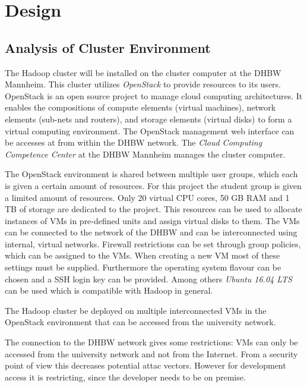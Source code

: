 \chapter{Design}
\label{chap:design}

\section{Analysis of Cluster Environment}

The Hadoop cluster will be installed on the cluster computer at the \ac{DHBW} Mannheim.
This cluster utilizes \emph{OpenStack}  to provide resources to its users. 
OpenStack is an open source project to manage cloud computing architectures.
It enables the compositions of compute elements (virtual machines), network elements (sub-nets and routers), 
and storage elements (virtual disks) to form a virtual computing environment.
The OpenStack management web interface can be accesses at  from within the \ac{DHBW} network. 
The \emph{Cloud Computing Competence Center} at the \ac{DHBW} Mannheim  manages the cluster computer.

The OpenStack environment is shared between multiple user groups, 
which each is given a certain amount of resources. 
For this project the student group is given a limited amount of resources.
Only 20 virtual \ac{CPU} cores, 50 \ac{GB} \ac{RAM} and 1 \ac{TB} of storage are dedicated to the project.
This resources can be used to allocate instances of \acp{VM} in pre-defined units and assign virtual disks to them.
The \acp{VM} can be connected to the network of the \ac{DHBW} and can be interconnected using internal, virtual networks.
Firewall restrictions can be set through group policies, which can be assigned to the \acp{VM}. 
When creating a new \ac{VM} most of these settings must be supplied. 
Furthermore the operating system flavour can be chosen and a \ac{SSH} login key can be provided.
Among others \emph{Ubuntu 16.04 LTS}  can be used which is compatible with Hadoop in general.

The Hadoop cluster be deployed on multiple interconnected \acp{VM} in the OpenStack environment that can be accessed from the university network.

The connection to the \ac{DHBW} network gives some restrictions: \acp{VM} can only be accessed from the university network and not from the Internet.
From a security point of view this decreases potential attac vectors.
However for development access it is restricting, 
since the developer needs to be on premise. 


